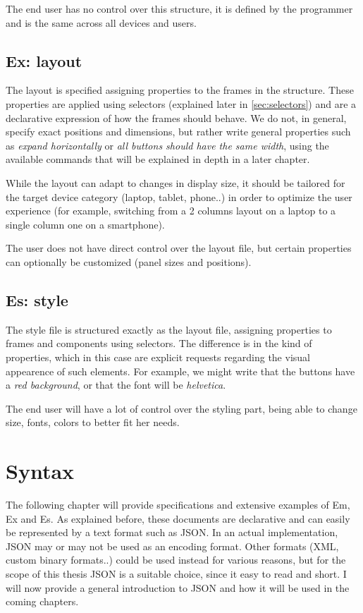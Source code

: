 The end user has no control over this structure, it is defined by the programmer and is the same across all devices and users.

\subsection{Ex: layout}
\label{design:ex}

The layout is specified assigning properties to the frames in the structure. These properties are applied using selectors (explained later in \ref{sec:selectors}) and are a declarative expression of how the frames should behave. We do not, in general, specify exact positions and dimensions, but rather write general properties such as \textit{expand horizontally} or \textit{all buttons should have the same width}, using the available commands that will be explained in depth in a later chapter.

While the layout can adapt to changes in display size, it should be tailored for the target device category (laptop, tablet, phone..) in order to optimize the user experience (for example, switching from a 2 columns layout on a laptop to a single column one on a smartphone).

The user does not have direct control over the layout file, but certain properties can optionally be customized (panel sizes and positions).

\subsection{Es: style}
\label{design:es}

The style file is structured exactly as the layout file, assigning properties to frames and components using selectors. The difference is in the kind of properties, which in this case are explicit requests regarding the visual appearence of such elements. For example, we might write that the buttons have a \textit{red background}, or that the font will be \textit{helvetica}.

The end user will have a lot of control over the styling part, being able to change size, fonts, colors to better fit her needs.

\section{Syntax}
\label{sec:design_syntax}
The following chapter will provide specifications and extensive examples of Em, Ex and Es. As explained before, these documents are declarative and can easily be represented by a text format such as JSON. In an actual implementation, JSON may or may not be used as an encoding format. Other formats (XML, custom binary formats..) could be used instead for various reasons, but for the scope of this thesis JSON is a suitable choice, since it easy to read and short. I will now provide a general introduction to JSON and how it will be used in the coming chapters.

